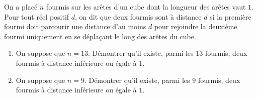 On a placé $n$ fourmis sur les arêtes d'un cube dont la longueur des arêtes vaut $1$. Pour tout réel positif $d$, on dit que deux fourmis sont à distance $d$ si la première fourmi doit parcourir une distance d'au moins $d$ pour rejoindre la deuxième fourmi uniquement en se déplaçant le long des arêtes du cube. 
\begin{enumerate}
\item On suppose que $n=13$. Démontrer qu'il existe, parmi les $13$ fourmis, deux fourmis à distance inférieure ou égale à $1$.
\item On suppose que $n=9$. Démontrer qu'il existe, parmi les $9$ fourmis, deux fourmis à distance inférieure ou égale à $1$.
\end{enumerate}